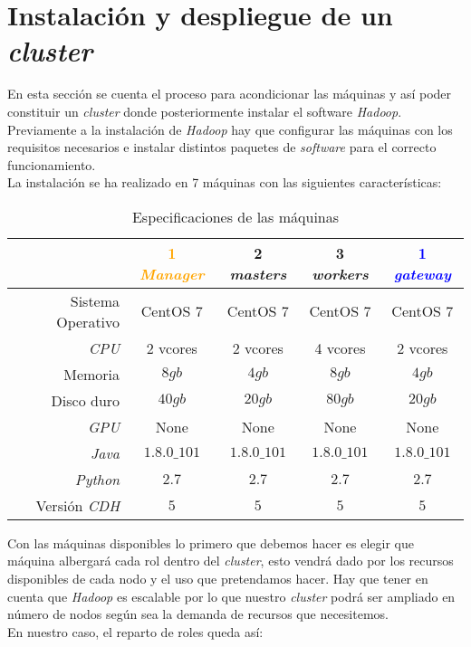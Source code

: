 
\chapter{Instalación y despliegue de un \textit{cluster}}
En esta sección se cuenta el proceso para acondicionar las máquinas y así poder constituir un 
\textit{cluster} donde posteriormente instalar el software \textit{Hadoop}.
Previamente a la instalación de \textit{Hadoop} hay que configurar las máquinas con los requisitos 
necesarios e instalar distintos paquetes de \textit{software} para el correcto funcionamiento.\\
La instalación se ha realizado en 7 máquinas con las siguientes características:

\begin{table}[!htbp]
  \centering
  \begin{tabular}{|r|c|c|c|c|} %
    \hline
    & \textcolor{Orange}{1 \textit{Manager}} & \textcolor{OliveGreen}{2 \textit{masters}} & \textcolor{BrickRed}{3 \textit{workers}} & \textcolor{blue}{1 \textit{gateway}} \\ \hline
    Sistema Operativo & CentOS 7 & CentOS 7 & CentOS 7 & CentOS 7 \\ \hline
    \textit{CPU} & 2 vcores & 2 vcores & 4 vcores & 2 vcores \\ \hline
    Memoria & $8gb$ & $4gb$ & $8gb$ & $4gb$ \\ \hline
    Disco duro & $40gb$ & $20gb$ & $80gb$ & $20gb$ \\ \hline
    \textit{GPU} & None & None & None & None \\ \hline
    \textit{Java} & $1.8.0\_101$ & $1.8.0\_101$ & $1.8.0\_101$ & $1.8.0\_101$ \\ \hline
    \textit{Python} & $2.7$ & $2.7$ & $2.7$ & $2.7$ \\ \hline
    Versión \textit{CDH} & $5$ & $5$ & $5$ & $5$ \\ \hline
  \end{tabular}
  \caption[\textit{Hardware} de las máquinas del \textit{cluster}]{Especificaciones de las máquinas}
  \label{cluster_machines_specification}
\end{table}

Con las máquinas disponibles lo primero que debemos hacer es elegir que máquina albergará cada rol dentro 
del \textit{cluster}, esto vendrá dado por los recursos disponibles de cada nodo y el uso que pretendamos hacer.
Hay que tener en cuenta que \textit{Hadoop} es escalable por lo que nuestro \textit{cluster} podrá 
ser ampliado en número de nodos según sea la demanda de recursos que necesitemos.\\
En nuestro caso, el reparto de roles queda así:

